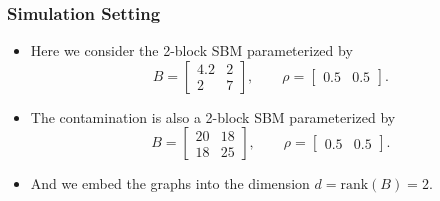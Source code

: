 \documentclass[a4paper]{article}
\begin{document}
\subsubsection{Simulation Setting}
\begin{itemize}
\item Here we consider the 2-block SBM parameterized by
\begin{equation*}
B = \begin{bmatrix}
4.2 & 2 \\
2 & 7
\end{bmatrix}
,\qquad \rho = \begin{bmatrix}
0.5 & 0.5
\end{bmatrix}.
\end{equation*}
\item The contamination is also a 2-block SBM parameterized by
\begin{equation*}
B = \begin{bmatrix}
20 & 18 \\
18 & 25
\end{bmatrix}
,\qquad \rho = \begin{bmatrix}
0.5 & 0.5
\end{bmatrix}.
\end{equation*}
\item And we embed the graphs into the dimension $d = \mathrm{rank}(B) = 2$.
\end{itemize}
\end{document}
